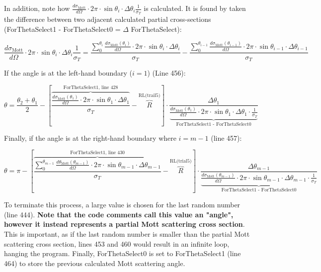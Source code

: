 \documentclass[10pt, reqno]{exam}
\begin{document}
In addition, note how $\frac{d\sigma_{\text{Mott}}}{d\Omega} \cdot 2\pi \cdot\sin\theta_{i}\cdot \Delta \theta_{i}\frac{1}{\sigma_T}$ is calculated. It is found by taken the difference between two adjacent calculated partial cross-sections (ForThetaSelect1 - ForThetaSelect0 = $\Delta$ ForThetaSelect): \par

\begin{equation}
    \frac{d\sigma_{\text{Mott}}}{d\Omega} \cdot 2\pi \cdot\sin\theta_{i}\cdot \Delta \theta_{i}\frac{1}{\sigma_T}  = \frac{\sum_0^{\theta_{i}}\frac{d\sigma_{\text{Mott}}(\theta_{i})}{d\Omega}\cdot 2\pi\cdot \sin\theta_{i}\cdot \Delta \theta_{i}}{\sigma_T} - \frac{\sum_0^{\theta_{i-1}}\frac{d\sigma_{\text{Mott}}(\theta_{i-1})}{d\Omega}\cdot 2\pi\cdot \sin\theta_{i-1}\cdot \Delta \theta_{i-1}}{\sigma_T}
\end{equation}

If the angle is at the left-hand boundary ($i = 1$) (Line 456): \par

\begin{equation}
    \theta = \frac{\theta_2 + \theta_1}{2} - \left[ \overbrace{\boxed{\frac{\frac{d\sigma_{\text{Mott}}(\theta_1)}{d\Omega}\cdot 2\pi\cdot \sin\theta_1\cdot \Delta \theta_ 1}{\sigma_T}}}^{\text{ForThetaSelect1, line 428}} - \overbrace{\boxed{R}}^{\text{RL(trail5)}}\right]\cdot \frac{\Delta\theta_1}{\underbrace{\boxed{\frac{d\sigma_{\text{Mott}}(\theta_1)}{d\Omega}\cdot 2\pi\cdot \sin\theta_{1}\cdot \Delta \theta_1\cdot \frac{1}{\sigma_T}}}_{\text{ForThetaSelect1 - ForThetaSelect0}}}
\end{equation}

Finally, if the angle is at the right-hand boundary where $i = m - 1$ (line 457): \par

\begin{equation}
    \theta = \pi - \left[ \overbrace{\boxed{\frac{\sum_0^{\theta_{m-1}}\frac{d\theta_{\text{Mott}}(\theta_{m -1})}{d\Omega}\cdot 2\pi\cdot \sin\theta_{m - 1}\cdot \Delta \theta_{m-1}}{\sigma_T}}}^{\text{ForThetaSelect1, line 430}} - \overbrace{\boxed{R}}^{\text{RL(trial5)}} \right] \cdot \frac{\Delta \theta_{m-1}}{\underbrace{\boxed{\frac{d\sigma_{\text{Mott}}(\theta_{m-1})}{d\Omega}\cdot 2\pi \cdot \sin\theta_{m - 1}\cdot \Delta \theta_{m-1}\cdot \frac{1}{\sigma_T}}}_{\text{ForThetaSelect1 - ForThetaSelect0}}}
\end{equation}

To terminate this process, a large value is chosen for the last random number (line 444). \textbf{Note that the code comments call this value an "angle", however it instead represents a partial Mott scattering cross section}. This is important, as if the last random number is smaller than the partial Mott scattering cross section, lines 453 and 460 would result in an infinite loop, hanging the program. Finally, ForThetaSelect0 is set to ForThetaSelect1 (line 464) to store the previous calculated Mott scattering angle.  \par
\end{document}
